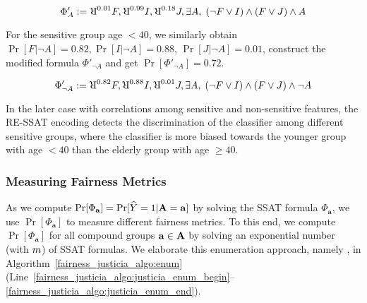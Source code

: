 \begin{example}
	\begin{equation}
	\Phi'_A := \R^{0.01}F, \R^{0.99}I, \R^{0.18}J, \exists A, \; (\neg F \vee I) \wedge (F \vee J) \wedge A\notag
	\end{equation}
	
	For the sensitive group age $ < 40 $,  we similarly obtain $ \Pr[F|\neg A] = 0.82, \Pr[I|\neg A] = 0.88 $, $ \Pr[J|\neg A] = 0.01 $, construct the modified formula $ \Phi'_{\neg A} $ and get  $ \Pr[\Phi'_{\neg A}] = 0.72 $. 

	\[ \Phi'_{\neg A} := \R^{0.82}F, \R^{0.88}I, \R^{0.01}J, \exists A, \; (\neg F \vee I) \wedge (F \vee J) \wedge \neg A \]	

	In the later case with correlations among sensitive and non-sensitive features, the RE-SSAT encoding detects the discrimination of the classifier among different sensitive groups, where the classifier is more biased towards the younger group with age $ < 40 $ than the elderly group with age $ \ge 40 $.
	
	

	
	
\end{example}

\subsubsection{Measuring Fairness Metrics}
As we compute $ \Pr[\Phi_\mathbf{a}] = \Pr[\widehat{Y} = 1 | \mathbf{A} = \mathbf{a}] $ by solving the SSAT formula $ \Phi_\mathbf{a} $, we  use $ \Pr[\Phi_\mathbf{a}] $ to measure different fairness metrics. To this end, we compute $ \Pr[\Phi_\mathbf{a}] $ for all compound groups $\mathbf{a} \in \mathbf{A} $ by solving an exponential number (with $ m $) of SSAT formulas. We elaborate this enumeration approach, namely {\justiciaenum}, in Algorithm~\ref{fairness_justicia_algo:enum}  (Line~\ref{fairness_justicia_algo:justicia_enum_begin}--\ref{fairness_justicia_algo:justicia_enum_end}).

